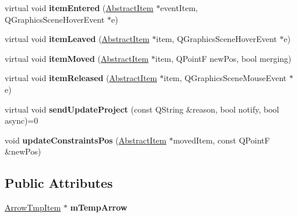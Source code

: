\begin{DoxyCompactItemize}
\item 
\hypertarget{class_abstract_scene_ae4577db04b1d1290909da2ab6073b708}{virtual void {\bfseries item\-Entered} (\hyperlink{class_abstract_item}{Abstract\-Item} $\ast$event\-Item, Q\-Graphics\-Scene\-Hover\-Event $\ast$e)}\label{class_abstract_scene_ae4577db04b1d1290909da2ab6073b708}

\item 
\hypertarget{class_abstract_scene_a8c1ec3d2355f9dd2a9a82638cb1e4ad1}{virtual void {\bfseries item\-Leaved} (\hyperlink{class_abstract_item}{Abstract\-Item} $\ast$item, Q\-Graphics\-Scene\-Hover\-Event $\ast$e)}\label{class_abstract_scene_a8c1ec3d2355f9dd2a9a82638cb1e4ad1}

\item 
\hypertarget{class_abstract_scene_a3572543494a44dc4b02e2ebc1ebeadac}{virtual void {\bfseries item\-Moved} (\hyperlink{class_abstract_item}{Abstract\-Item} $\ast$item, Q\-Point\-F new\-Pos, bool merging)}\label{class_abstract_scene_a3572543494a44dc4b02e2ebc1ebeadac}

\item 
\hypertarget{class_abstract_scene_ae636348ea451b4ed97dae3176e6bd19a}{virtual void {\bfseries item\-Released} (\hyperlink{class_abstract_item}{Abstract\-Item} $\ast$item, Q\-Graphics\-Scene\-Mouse\-Event $\ast$e)}\label{class_abstract_scene_ae636348ea451b4ed97dae3176e6bd19a}

\item 
\hypertarget{class_abstract_scene_a3f210515e9512bbac044f0f92ecc71bc}{virtual void {\bfseries send\-Update\-Project} (const Q\-String \&reason, bool notify, bool async)=0}\label{class_abstract_scene_a3f210515e9512bbac044f0f92ecc71bc}

\item 
\hypertarget{class_abstract_scene_afc39c480231fbee7e88c604aba2cc437}{void {\bfseries update\-Constraints\-Pos} (\hyperlink{class_abstract_item}{Abstract\-Item} $\ast$moved\-Item, const Q\-Point\-F \&new\-Pos)}\label{class_abstract_scene_afc39c480231fbee7e88c604aba2cc437}

\end{DoxyCompactItemize}
\subsection*{Public Attributes}
\begin{DoxyCompactItemize}
\item 
\hypertarget{class_abstract_scene_a0828ac6ee6d061e0ee36a6dbde50aad0}{\hyperlink{class_arrow_tmp_item}{Arrow\-Tmp\-Item} $\ast$ {\bfseries m\-Temp\-Arrow}}\label{class_abstract_scene_a0828ac6ee6d061e0ee36a6dbde50aad0}

\end{DoxyCompactItemize}
